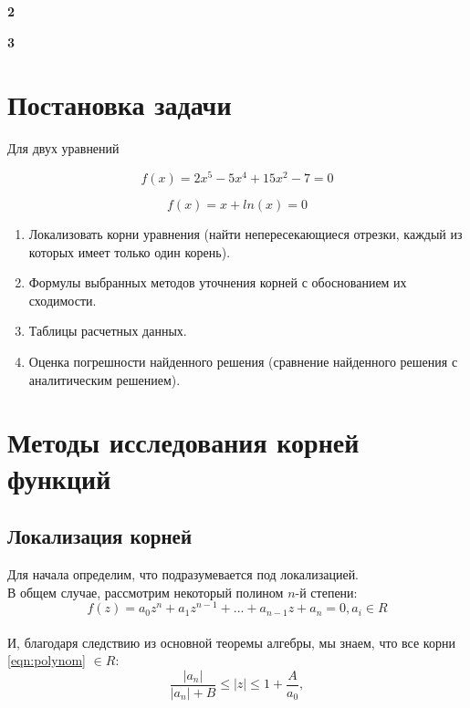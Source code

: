\documentclass[a4paper,12pt]{article}
\begin{document}
\newpage
\begin{center}
{\bf2}\\
\vspace{0.5cm}
\tableofcontents
\end{center}
\thispagestyle{empty}
\setcounter{page}{2}


\newpage
\begin{center}
{\bf3}\\
\vspace{0.5cm}
\end{center}
\setcounter{page}{3}
\section{Постановка задачи}

Для двух уравнений

\begin{equation}
    f(x) = 2x^5 - 5x^4 + 15x^2 - 7 = 0
    \label{eqn:firstfunc}
\end{equation}

\begin{equation}
    f(x) = x + ln(x) = 0
    \label{eqn:secondfunc}
\end{equation}

\begin{enumerate}
    \item Локализовать корни уравнения (найти непересекающиеся отрезки, каждый из которых имеет только один корень).
    \item Формулы выбранных методов уточнения корней с обоснованием их сходимости.
    \item Таблицы расчетных данных.
    \item Оценка погрешности найденного решения (сравнение найденного решения с аналитическим решением).
\end{enumerate}
\vspace{\baselineskip}

\vspace{1.5cm}
\section{Методы исследования корней функций}\label{methods}


\subsection{Локализация корней}
Для начала определим, что подразумевается под локализацией.  \\
В общем случае, рассмотрим некоторый полином $n$-й степени:
\begin{equation}
    f(z) = a_{0}z^n + a_{1}z^{n-1} + ... + a_{n-1}z + a_n = 0,  a_i \in R
    \label{eqn:polynom}
\end{equation}
 \\
 И, благодаря следствию из основной теоремы алгебры, мы знаем, что все корни \ref{eqn:polynom} $\in R$:
\begin{equation}
    \frac{|a_n|}{|a_n| + B} \le |z| \le 1 + \frac{A}{a_0},
    \label{eqn:circle}
\end{equation}
\end{document}
